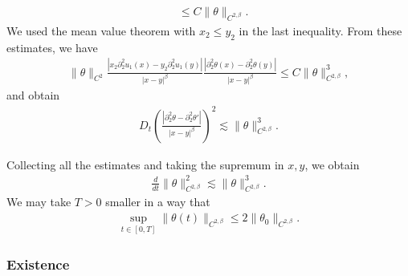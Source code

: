 \documentclass[10pt]{amsart}
\theoremstyle{definition}
\theoremstyle{remark}
\numberwithin{equation}{section}
\newcommand{\rd}{\partial}
\newcommand{\0}{\emptyset}
\newcommand{\bt}{\beta}
\newcommand{\tht}{\theta}
\begin{document}
\begin{equation*}
\begin{aligned}
			&\leq C \| \tht \|_{C^{2,\beta}}.
		\end{aligned}
	\end{equation*} We used the mean value theorem with $x_2 \leq y_2$ in the last inequality. From these estimates, we have \begin{equation*}
		\begin{aligned}
			\| \tht \|_{C^2} \frac{|x_2 \rd_2^2 u_1(x) - y_2 \rd_2^2 u_1(y)|}{|x-y|^{\beta}} \frac{|\rd_{2}^{2} \tht(x) - \rd_2^2 \tht(y)|}{|x-y|^{\beta}}  \leq C\| \tht \|_{C^{2,\beta}}^3,
		\end{aligned}
	\end{equation*} and obtain \begin{equation*}
			\begin{split}
				D_t\left( \frac{|\partial_{2}^2\tht - \partial_{2}^2\tht'|}{|x-y|^{\bt}} \right)^2 \lesssim \| \tht \|_{C^{2,\beta}}^3.
			\end{split}
		\end{equation*}
		
		
		Collecting all the estimates and taking the supremum in $x, y$, we obtain \begin{equation}\label{eq:C2beta-apriori}
				\begin{split}
					\frac{d}{dt} \| \tht \|_{C^{2,\beta}}^2 \lesssim \| \tht \|_{C^{2,\beta}}^3.
				\end{split}
			\end{equation} We may take $T>0$ smaller in a way that \begin{equation}\label{eq:C2beta-apriori2}
				\begin{split}
					\sup_{ t \in [0,T] }\| \tht(t) \|_{C^{2,\beta}} \le 2\| \tht_{0} \|_{C^{2,\beta}}.
				\end{split}
			\end{equation}
			
			\subsubsection{Existence}
			
\end{document}
